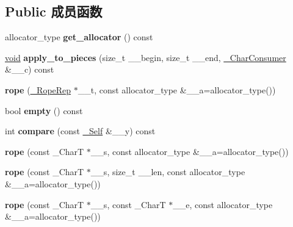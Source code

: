 \subsection*{Public 成员函数}
\begin{DoxyCompactItemize}
\item 
\mbox{\label{classrope_a8a3d1439bd4eb729b5467ab1f5a70f2c}} 
allocator\+\_\+type {\bfseries get\+\_\+allocator} () const
\item 
\mbox{\label{classrope_a0536c4f13f1b53682499d23b4985a0bc}} 
\hyperlink{interfacevoid}{void} {\bfseries apply\+\_\+to\+\_\+pieces} (size\+\_\+t \+\_\+\+\_\+begin, size\+\_\+t \+\_\+\+\_\+end, \hyperlink{class___rope__char__consumer}{\+\_\+\+Char\+Consumer} \&\+\_\+\+\_\+c) const
\item 
\mbox{\label{classrope_ac15ad08ab8fc6b046dca86890218a6a2}} 
{\bfseries rope} (\hyperlink{struct___rope___rope_rep}{\+\_\+\+Rope\+Rep} $\ast$\+\_\+\+\_\+t, const allocator\+\_\+type \&\+\_\+\+\_\+a=allocator\+\_\+type())
\item 
\mbox{\label{classrope_a5b6f175c0f6665df2c253f58529122b6}} 
bool {\bfseries empty} () const
\item 
\mbox{\label{classrope_a5a95e9e41fe6acec88ba32569e9b47ce}} 
int {\bfseries compare} (const \hyperlink{classrope}{\+\_\+\+Self} \&\+\_\+\+\_\+y) const
\item 
\mbox{\label{classrope_a9f1f74feeeb7d395bde2e6f16f17ddd2}} 
{\bfseries rope} (const \+\_\+\+CharT $\ast$\+\_\+\+\_\+s, const allocator\+\_\+type \&\+\_\+\+\_\+a=allocator\+\_\+type())
\item 
\mbox{\label{classrope_aae5ee4060ce6962b0c39b17457e4be44}} 
{\bfseries rope} (const \+\_\+\+CharT $\ast$\+\_\+\+\_\+s, size\+\_\+t \+\_\+\+\_\+len, const allocator\+\_\+type \&\+\_\+\+\_\+a=allocator\+\_\+type())
\item 
\mbox{\label{classrope_ac204fc9f492bf43a5a85f4786a6813b9}} 
{\bfseries rope} (const \+\_\+\+CharT $\ast$\+\_\+\+\_\+s, const \+\_\+\+CharT $\ast$\+\_\+\+\_\+e, const allocator\+\_\+type \&\+\_\+\+\_\+a=allocator\+\_\+type())
\item 

\end{DoxyCompactItemize}
